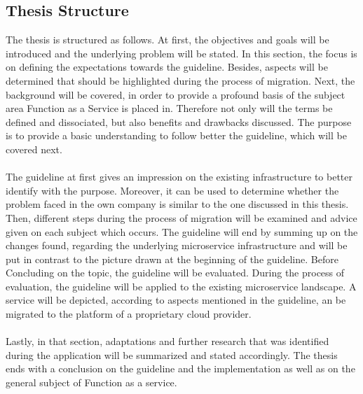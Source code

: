 \documentclass[a4paper,twoside,11pt, pagesize]{scrartcl}
\begin{document}
\begin{spacing}{1.2}
\subsection{Thesis Structure}
The thesis is structured as follows. At first, the objectives and goals will be introduced and the underlying problem will be stated. In this section, the focus is on defining the expectations towards the guideline. Besides, aspects will be determined that should be highlighted during the process of migration. Next, the background will be covered, in order to provide a profound basis of the subject area Function as a Service is placed in. Therefore not only will the terms be defined and dissociated, but also benefits and drawbacks discussed. The purpose is to provide a basic understanding to follow better the guideline, which will be covered next.\\\\ The guideline at first gives an impression on the existing infrastructure to better identify with the purpose. Moreover, it can be used to determine whether the problem faced in the own company is similar to the one discussed in this thesis. Then, different steps during the process of migration will be examined and advice given on each subject which occurs. The guideline will end by summing up on the changes found, regarding the underlying microservice infrastructure and will be put in contrast to the picture drawn at the beginning of the guideline. Before Concluding on the topic, the guideline will be evaluated. During the process of evaluation, the guideline will be applied to the existing microservice landscape. A service will be depicted, according to aspects mentioned in the guideline, an be migrated to the platform of a proprietary cloud provider.\\\\ Lastly, in that section, adaptations and further research that was identified during the application will be summarized and stated accordingly. The thesis ends with a conclusion on the guideline and the implementation as well as on the general subject of Function as a service.
\newpage

\end{spacing}
\end{document}
